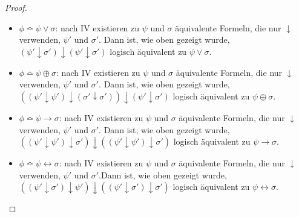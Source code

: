 \documentclass[a4paper,10pt]{article}
\begin{document}
\begin{enumerate}
\begin{proof}
\begin{itemize}
\begin{itemize}
\item $\phi \bumpeq \psi \vee \sigma$: nach IV existieren zu $\psi$ und $\sigma$ äquivalente Formeln, die nur $\downarrow$ verwenden, $\psi'$ und $\sigma'$. Dann ist, wie oben gezeigt wurde, $(\psi' \downarrow \sigma') \downarrow (\psi' \downarrow \sigma')$ logisch äquivalent zu $\psi \vee \sigma$.
\item $\phi \bumpeq \psi \oplus \sigma$: nach IV existieren zu $\psi$ und $\sigma$ äquivalente Formeln, die nur $\downarrow$ verwenden, $\psi'$ und $\sigma'$. Dann ist, wie oben gezeigt wurde, $((\psi' \downarrow \psi') \downarrow (\sigma' \downarrow \sigma')) \downarrow (\psi' \downarrow \sigma')$ logisch äquivalent zu $\psi \oplus \sigma$.
\item $\phi \bumpeq \psi \rightarrow \sigma$: nach IV existieren zu $\psi$ und $\sigma$ äquivalente Formeln, die nur $\downarrow$ verwenden, $\psi'$ und $\sigma'$. Dann ist, wie oben gezeigt wurde, $((\psi' \downarrow \psi') \downarrow \sigma') \downarrow ((\psi' \downarrow \psi') \downarrow \sigma')$ logisch äquivalent zu $\psi \rightarrow \sigma$.
\item $\phi \bumpeq \psi \leftrightarrow \sigma$: nach IV existieren zu $\psi$ und $\sigma$ äquivalente Formeln, die nur $\downarrow$ verwenden, $\psi'$ und $\sigma'$.Dann ist, wie oben gezeigt wurde, $((\psi' \downarrow \sigma') \downarrow \psi') \downarrow ((\psi' \downarrow \sigma') \downarrow \sigma')$ logisch äquivalent zu $\psi \leftrightarrow \sigma$.
\end{itemize} 
\end{itemize}
\end{proof}
\end{enumerate}
\end{document}
